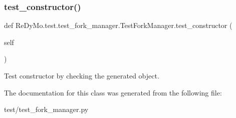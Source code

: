 \subsubsection{\texorpdfstring{test\+\_\+constructor()}{test\_constructor()}}
{\footnotesize\ttfamily def Re\+Dy\+Mo.\+test.\+test\+\_\+fork\+\_\+manager.\+Test\+Fork\+Manager.\+test\+\_\+constructor (\begin{DoxyParamCaption}\item[{}]{self }\end{DoxyParamCaption})}



Test constructor by checking the generated object. 



The documentation for this class was generated from the following file\+:\begin{DoxyCompactItemize}
\item 
test/test\+\_\+fork\+\_\+manager.\+py\end{DoxyCompactItemize}
